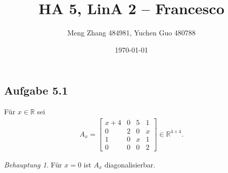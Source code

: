 \documentclass[draft,a5paper]{article}
\author{Meng Zhang 484981, Yuchen Guo 480788}
\date{\today}
\title{HA 5, LinA 2 -- Francesco}
\theoremstyle{remark}
\newtheorem*{beh}{Behauptung}
\begin{document}
\maketitle

\subsection*{Aufgabe 5.1}

Für \(x \in \mathbb{R}\) sei
\begin{align*}
  A_{x} =
  \begin{bmatrix}
    x + 4 & 0 & 5 & 1 \\
    0 & 2 & 0 & x \\
    1 & 0 & x & 1 \\
    0 & 0 & 0 & 2
  \end{bmatrix}
  \in \mathbb{R}^{4 \times 4}.
\end{align*}

\begin{beh}
  Für \(x = 0\) ist \(A_{x}\) diagonalisierbar.
\end{beh}
\end{document}
